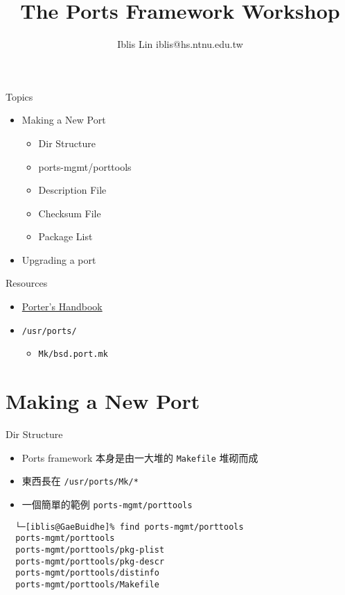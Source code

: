 \documentclass[aspectratio=169]{beamer}
\title{The Ports Framework Workshop}
\author{Iblis Lin \textlangle{}iblis@hs.ntnu.edu.tw\textrangle{}}
\begin{document}
\begin{frame}
  \titlepage
\end{frame}

\begin{frame}[t,fragile]{Topics}
  \begin{itemize}
    \item Making a New Port
      \begin{itemize}
        \item Dir Structure
        \item ports-mgmt/porttools
        \item Description File
        \item Checksum File
        \item Package List
      \end{itemize}
    \item Upgrading a port
  \end{itemize}
\end{frame}

\begin{frame}[t,fragile]{Resources}
  \begin{itemize}
    \item \href{https://www.freebsd.org/doc/en_US.ISO8859-1/books/porters-handbook/book.html}{Porter's Handbook}
    \item \verb|/usr/ports/|
      \begin{itemize}
        \item \verb|Mk/bsd.port.mk|
      \end{itemize}
  \end{itemize}
\end{frame}

\section{Making a New Port}
\begin{frame}[t,fragile]{Dir Structure}
  \begin{itemize}
    \item Ports framework 本身是由一大堆的 \verb|Makefile| 堆砌而成
    \item 東西長在 \verb|/usr/ports/Mk/*|
    \item 一個簡單的範例 \verb|ports-mgmt/porttools|
  \end{itemize}

  \begin{verbatim}
  └─[iblis@GaeBuidhe]% find ports-mgmt/porttools
  ports-mgmt/porttools
  ports-mgmt/porttools/pkg-plist
  ports-mgmt/porttools/pkg-descr
  ports-mgmt/porttools/distinfo
  ports-mgmt/porttools/Makefile
  \end{verbatim}
\end{frame}
\end{document}
